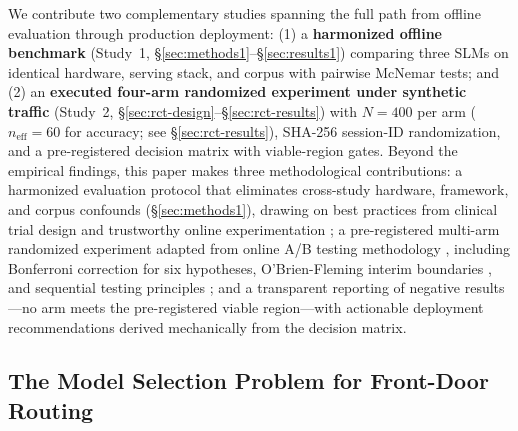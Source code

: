 \documentclass{article}
\begin{document}
We contribute two complementary studies spanning the full path from offline evaluation through production deployment: (1) a \textbf{harmonized offline benchmark} (Study~1, \S\ref{sec:methods1}--\S\ref{sec:results1}) comparing three SLMs on identical hardware, serving stack, and corpus with pairwise McNemar tests; and (2) an \textbf{executed four-arm randomized experiment under synthetic traffic} (Study~2, \S\ref{sec:rct-design}--\S\ref{sec:rct-results}) with $N = 400$ per arm ($n_{\text{eff}} = 60$ for accuracy; see \S\ref{sec:rct-results}), SHA-256 session-ID randomization, and a pre-registered decision matrix with viable-region gates. Beyond the empirical findings, this paper makes three methodological contributions: a harmonized evaluation protocol that eliminates cross-study hardware, framework, and corpus confounds (\S\ref{sec:methods1}), drawing on best practices from clinical trial design \citep{schulz2010consort} and trustworthy online experimentation \citep{kohavi2020trustworthy,kohavi2009experiments}; a pre-registered multi-arm randomized experiment adapted from online A/B testing methodology \citep{kohavi2020trustworthy}, including Bonferroni correction for six hypotheses, O'Brien-Fleming interim boundaries \citep{obrien1979}, and sequential testing principles \citep{wald1945}; and a transparent reporting of negative results---no arm meets the pre-registered viable region---with actionable deployment recommendations derived mechanically from the decision matrix.

\subsection{The Model Selection Problem for Front-Door Routing}
\label{sec:model-selection}
\end{document}
